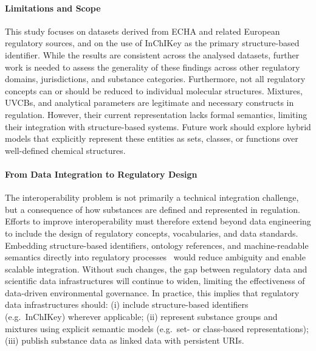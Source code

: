 \paragraph{Limitations and Scope}

This study focuses on datasets derived from ECHA and related European regulatory sources, and on the use of InChIKey as the primary structure-based identifier. While the results are consistent across the analysed datasets, further work is needed to assess the generality of these findings across other regulatory domains, jurisdictions, and substance categories. Furthermore, not all regulatory concepts can or should be reduced to individual molecular structures. Mixtures, UVCBs, and analytical parameters are legitimate and necessary constructs in regulation. However, their current representation lacks formal semantics, limiting their integration with structure-based systems. Future work should explore hybrid models that explicitly represent these entities as sets, classes, or functions over well-defined chemical structures.

\paragraph{From Data Integration to Regulatory Design}

The interoperability problem is not primarily a technical integration challenge, but a consequence of how substances are defined and represented in regulation. Efforts to improve interoperability must therefore extend beyond data engineering to include the design of regulatory concepts, vocabularies, and data standards. Embedding structure-based identifiers, ontology references, and machine-readable semantics directly into regulatory processes~\cite{EIF2017,InteroperableEuropeAct2024} would reduce ambiguity and enable scalable integration. Without such changes, the gap between regulatory data and scientific data infrastructures will continue to widen, limiting the effectiveness of data-driven environmental governance. In practice, this implies that regulatory data infrastructures should:
(i) include structure-based identifiers (e.g.~InChIKey) wherever applicable;
(ii) represent substance groups and mixtures using explicit semantic models (e.g.~set- or class-based representations);
(iii) publish substance data as linked data with persistent URIs.